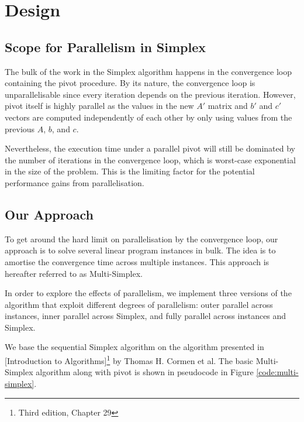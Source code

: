 \section{Design}

\subsection{Scope for Parallelism in Simplex}
The bulk of the work in the Simplex algorithm happens in the convergence loop containing the pivot procedure. By its nature, the convergence loop is unparallelisable since every iteration depends on the previous iteration. However, pivot itself is highly parallel as the values in the new $A'$ matrix and $b'$ and $c'$ vectors are computed independently of each other by only using values from the previous $A$, $b$, and $c$.

Nevertheless, the execution time under a parallel pivot will still be dominated by the number of iterations in the convergence loop, which is worst-case exponential in the size of the problem. This is the limiting factor for the potential performance gains from parallelisation.

\subsection{Our Approach}
To get around the hard limit on parallelisation by the convergence loop, our approach is to solve several linear program instances in bulk. The idea is to amortise the convergence time across multiple instances. This approach is hereafter referred to as Multi-Simplex.

In order to explore the effects of parallelism, we implement three versions of the algorithm that exploit different degrees of parallelism: outer parallel across instances, inner parallel across Simplex, and fully parallel across instances and Simplex.

We base the sequential Simplex algorithm on the algorithm presented in [Introduction to Algorithms]\footnote{Third edition, Chapter 29} by Thomas H. Cormen et al. The basic Multi-Simplex algorithm along with pivot is shown in pseudocode in Figure \ref{code:multi-simplex}.

